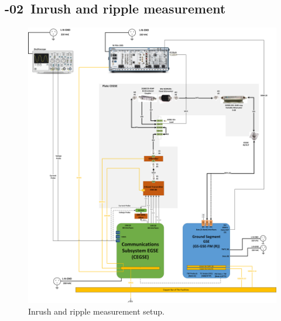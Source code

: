 \setcounter{Sec}{0}\setcounter{Step}{0}

\newpage
\renewcommand{\subprocid}{{\procid}-02}

\newpage
\subsection{\subprocid \ Inrush and ripple measurement }


\begin{figure}[H]
	\centering
	  \includegraphics[width=.9\linewidth]{figuras/EWC30PXISetupA.png}  
	  \caption{Inrush and ripple measurement setup.}
	\label{fig:setup_xband_funcional_ripple}
	\end{figure}
\newpage
